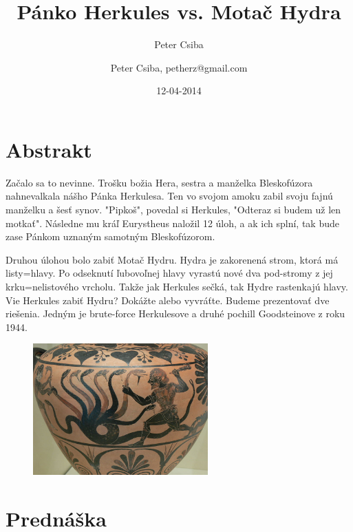 \documentclass[12pt,a4paper]{article}
\author{Peter Csiba}
\title{Pánko Herkules vs. Motač Hydra}
\date{12-04-2014}
\author{Peter Csiba, petherz@gmail.com}
\begin{document}
\maketitle

\section*{Abstrakt}
Začalo sa to nevinne. Trošku božia Hera, sestra a manželka Bleskofúzora nahnevalkala nášho Pánka Herkulesa. Ten vo svojom amoku zabil svoju fajnú manželku a šesť synov. "Pipkoš", povedal si Herkules, "Odteraz si budem už len motkať". Následne mu kráľ Eurystheus naložil 12 úloh, a ak ich splní, tak bude zase Pánkom uznaným samotným Bleskofúzorom. 

Druhou úlohou bolo zabiť Motač Hydru. Hydra je zakorenená strom, ktorá má listy=hlavy. Po odseknutí ľubovoľnej hlavy vyrastú nové dva pod-stromy z jej krku=nelistového vrcholu. Takže jak Herkules sečká, tak Hydre rastenkajú hlavy. Vie Herkules zabiť Hydru? Dokážte alebo vyvráťte. Budeme prezentovať dve riešenia. Jedným je brute-force Herkulesove a druhé pochill Goodsteinove z roku 1944. 

\begin{figure}[H]
\centering
\includegraphics[width=0.6\textwidth]{hydra.png}
\end{figure} 

\section*{Prednáška}
\end{document}

